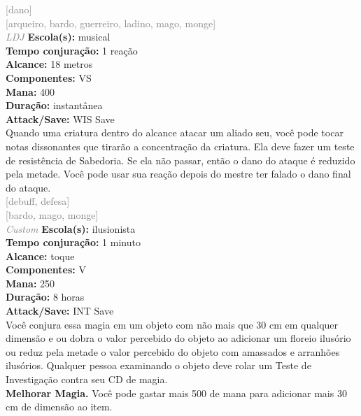 \documentclass{RPG_Adventure}[2021/10/20]
\begin{document}
{\scriptsize \textcolor{gray}{[dano]\\}}
{\scriptsize \textcolor{gray}{[arqueiro, bardo, guerreiro, ladino, mago, monge]\\}}
{\tiny \textcolor{gray}{\textit{LDJ}}}
{\small \t \textbf{Escola(s):} musical\\\t \textbf{Tempo conjuração:} 1 reação\\\t \textbf{Alcance:} 18 metros\\\t \textbf{Componentes:} VS\\\t \textbf{Mana:} 400\\\t \textbf{Duração:} instantânea\\\t \textbf{Attack/Save:} WIS Save\\}
{\normalsize Quando uma criatura dentro do alcance atacar um aliado seu, você pode tocar notas dissonantes que tirarão a concentração da criatura. Ela deve fazer um teste de resistência de Sabedoria. Se ela não passar, então o dano do ataque é reduzido pela metade. Você pode usar sua reação depois do mestre ter falado o dano final do ataque.\\}
{\scriptsize \textcolor{gray}{[debuff, defesa]\\}}
{\scriptsize \textcolor{gray}{[bardo, mago, monge]\\}}
{\tiny \textcolor{gray}{\textit{Custom}}}
{\small \t \textbf{Escola(s):} ilusionista\\\t \textbf{Tempo conjuração:} 1 minuto\\\t \textbf{Alcance:} toque\\\t \textbf{Componentes:} V\\\t \textbf{Mana:} 250\\\t \textbf{Duração:} 8 horas\\\t \textbf{Attack/Save:} INT Save\\}
{\normalsize Você conjura essa magia em um objeto com não mais que 30 cm em qualquer dimensão e ou dobra o valor percebido do objeto ao adicionar um floreio ilusório ou reduz pela metade o valor percebido do objeto com amassados e arranhões ilusórios. Qualquer pessoa examinando o objeto deve rolar um Teste de Investigação contra seu CD de magia.\\\t \textbf{Melhorar Magia.} Você pode gastar mais 500 de mana para adicionar mais 30 cm de dimensão ao item.\\}
\end{document}
